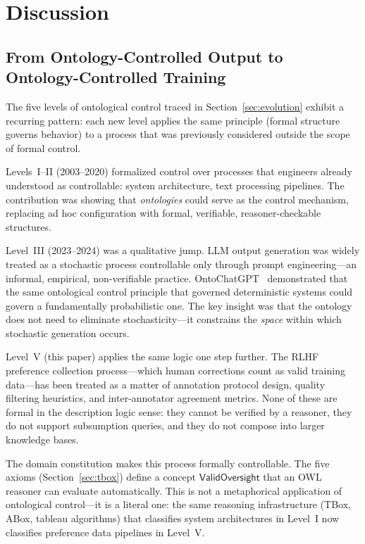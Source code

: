 \documentclass[11pt]{article}
\begin{document}
\section{Discussion}
\label{sec:discussion}

\subsection{From Ontology-Controlled Output to Ontology-Controlled Training}
\label{sec:disc-output-to-training}

The five levels of ontological control traced in Section~\ref{sec:evolution} exhibit a recurring pattern: each new level applies the same principle (formal structure governs behavior) to a process that was previously considered outside the scope of formal control.

Levels~I--II (2003--2020) formalized control over processes that engineers already understood as controllable: system architecture, text processing pipelines.
The contribution was showing that \emph{ontologies} could serve as the control mechanism, replacing ad hoc configuration with formal, verifiable, reasoner-checkable structures.

Level~III (2023--2024) was a qualitative jump.
LLM output generation was widely treated as a stochastic process controllable only through prompt engineering---an informal, empirical, non-verifiable practice.
OntoChatGPT~\citep{palagin2023ontochatgpt} demonstrated that the same ontological control principle that governed deterministic systems could govern a fundamentally probabilistic one.
The key insight was that the ontology does not need to eliminate stochasticity---it constrains the \emph{space} within which stochastic generation occurs.

Level~V (this paper) applies the same logic one step further.
The RLHF preference collection process---which human corrections count as valid training data---has been treated as a matter of annotation protocol design, quality filtering heuristics, and inter-annotator agreement metrics.
None of these are formal in the description logic sense: they cannot be verified by a reasoner, they do not support subsumption queries, and they do not compose into larger knowledge bases.

The domain constitution makes this process formally controllable.
The five axioms (Section~\ref{sec:tbox}) define a concept $\mathsf{ValidOversight}$ that an OWL reasoner can evaluate automatically.
This is not a metaphorical application of ontological control---it is a literal one: the same reasoning infrastructure (TBox, ABox, tableau algorithms) that classifies system architectures in Level~I now classifies preference data pipelines in Level~V.
\end{document}
